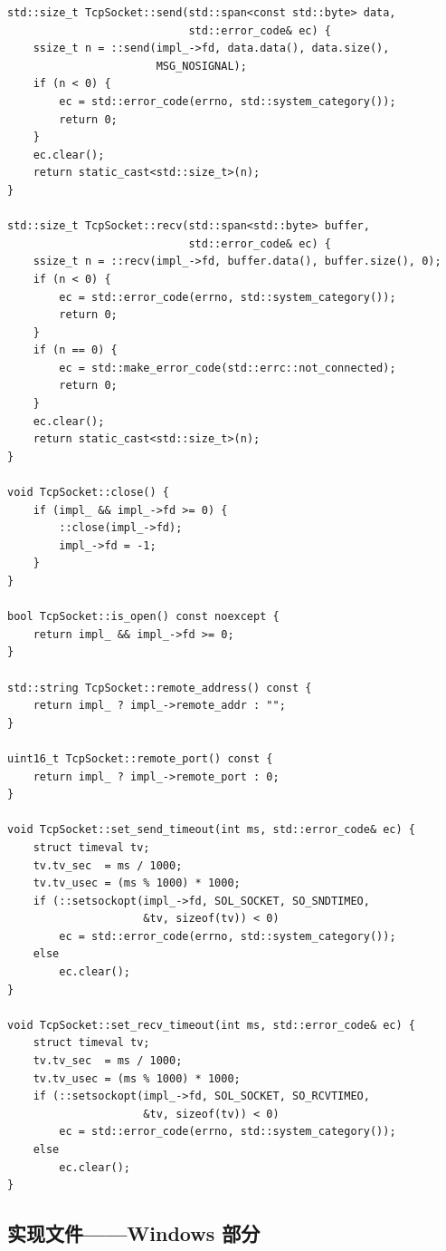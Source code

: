 \documentclass[12pt,a4paper,fontset=fandol]{ctexbook}
\begin{document}
\begin{lstlisting}
std::size_t TcpSocket::send(std::span<const std::byte> data,
                            std::error_code& ec) {
    ssize_t n = ::send(impl_->fd, data.data(), data.size(),
                       MSG_NOSIGNAL);
    if (n < 0) {
        ec = std::error_code(errno, std::system_category());
        return 0;
    }
    ec.clear();
    return static_cast<std::size_t>(n);
}

std::size_t TcpSocket::recv(std::span<std::byte> buffer,
                            std::error_code& ec) {
    ssize_t n = ::recv(impl_->fd, buffer.data(), buffer.size(), 0);
    if (n < 0) {
        ec = std::error_code(errno, std::system_category());
        return 0;
    }
    if (n == 0) {
        ec = std::make_error_code(std::errc::not_connected);
        return 0;
    }
    ec.clear();
    return static_cast<std::size_t>(n);
}

void TcpSocket::close() {
    if (impl_ && impl_->fd >= 0) {
        ::close(impl_->fd);
        impl_->fd = -1;
    }
}

bool TcpSocket::is_open() const noexcept {
    return impl_ && impl_->fd >= 0;
}

std::string TcpSocket::remote_address() const {
    return impl_ ? impl_->remote_addr : "";
}

uint16_t TcpSocket::remote_port() const {
    return impl_ ? impl_->remote_port : 0;
}

void TcpSocket::set_send_timeout(int ms, std::error_code& ec) {
    struct timeval tv;
    tv.tv_sec  = ms / 1000;
    tv.tv_usec = (ms % 1000) * 1000;
    if (::setsockopt(impl_->fd, SOL_SOCKET, SO_SNDTIMEO,
                     &tv, sizeof(tv)) < 0)
        ec = std::error_code(errno, std::system_category());
    else
        ec.clear();
}

void TcpSocket::set_recv_timeout(int ms, std::error_code& ec) {
    struct timeval tv;
    tv.tv_sec  = ms / 1000;
    tv.tv_usec = (ms % 1000) * 1000;
    if (::setsockopt(impl_->fd, SOL_SOCKET, SO_RCVTIMEO,
                     &tv, sizeof(tv)) < 0)
        ec = std::error_code(errno, std::system_category());
    else
        ec.clear();
}
\end{lstlisting}

\subsection{实现文件——Windows 部分}
\end{document}
